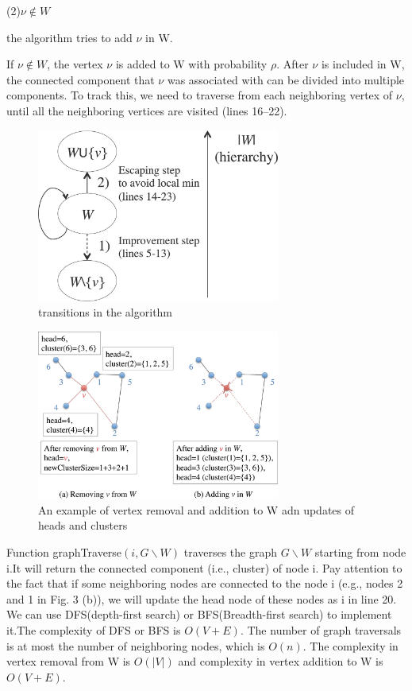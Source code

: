 \documentclass[10pt,journal]{IEEEtran}
\begin{document}
(2)$\nu\notin W$

the algorithm tries to add $\nu$ in W.

If $\nu\notin W$, the vertex $\nu$ is added to W with probability $\rho$. After $\nu$ is included in
W, the connected component that $\nu$ was associated with can be divided
into multiple components. To track this, we need to traverse from each
neighboring vertex of $\nu$, until all the neighboring vertices are visited
(lines 16–22).
\begin{figure}[htbp]
	\centering
	\includegraphics[width=8cm]{img/m2}
	\caption[]{transitions in the algorithm}
\end{figure}


\begin{figure}[htbp]
	\centering
	\includegraphics[width=8cm]{img/add_remove}
	\caption[]{An example of vertex removal and addition to W adn updates of heads and clusters}
\end{figure}
 Function graphTraverse$(i, G\backslash W)$ traverses the
graph $G\backslash W$ starting from node i.It will return the connected component
(i.e., cluster) of node i. Pay attention to the fact that if some neighboring nodes are connected
to the node i (e.g., nodes 2 and 1 in Fig. 3 (b)), we will update the head node of
these nodes as i in line 20.
We can use DFS(depth-first search) or BFS(Breadth-first search) to implement it.The complexity of DFS or BFS is $O( V + E )$. The number of graph traversals is
at most the number of neighboring nodes, which is $O(n)$. The complexity
in vertex removal from W is $O(|V|)$ and complexity in vertex
addition to W is $O( V + E )$. 
\end{document}
